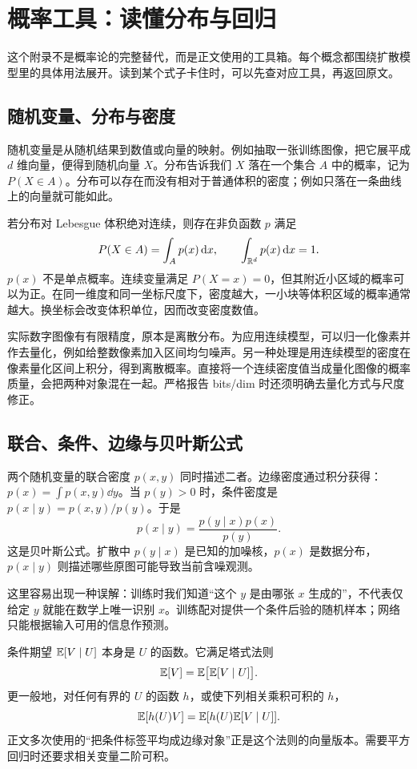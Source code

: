 \chapter{概率工具：读懂分布与回归}\label{app:probability}
这个附录不是概率论的完整替代，而是正文使用的工具箱。每个概念都围绕扩散模型里的具体用法展开。读到某个式子卡住时，可以先查对应工具，再返回原文。

\section{随机变量、分布与密度}
随机变量是从随机结果到数值或向量的映射。例如抽取一张训练图像，把它展平成 $d$ 维向量，便得到随机向量 $X$。分布告诉我们 $X$ 落在一个集合 $A$ 中的概率，记为 $P(X\in A)$。分布可以存在而没有相对于普通体积的密度；例如只落在一条曲线上的向量就可能如此。

若分布对 Lebesgue 体积绝对连续，则存在非负函数 $p$ 满足
\begin{equation}
 P(X\in A)=\int_Ap(x)\mathop{}\!\mathrm{d} x,\qquad\int_{\mathbb{R}^d}p(x)\mathop{}\!\mathrm{d} x=1.
\end{equation}
$p(x)$ 不是单点概率。连续变量满足 $P(X=x)=0$，但其附近小区域的概率可以为正。在同一维度和同一坐标尺度下，密度越大，一小块等体积区域的概率通常越大。换坐标会改变体积单位，因而改变密度数值。

实际数字图像有有限精度，原本是离散分布。为应用连续模型，可以归一化像素并作去量化，例如给整数像素加入区间均匀噪声。另一种处理是用连续模型的密度在像素量化区间上积分，得到离散概率。直接将一个连续密度值当成量化图像的概率质量，会把两种对象混在一起。严格报告 bits/dim 时还须明确去量化方式与尺度修正。

\section{联合、条件、边缘与贝叶斯公式}
两个随机变量的联合密度 $p(x,y)$ 同时描述二者。边缘密度通过积分获得：$p(x)=\int p(x,y)\dd y$。当 $p(y)>0$ 时，条件密度是 $p(x\mid y)=p(x,y)/p(y)$。于是
\begin{equation}
 p(x\mid y)=\frac{p(y\mid x)p(x)}{p(y)}.
\end{equation}
这是贝叶斯公式。扩散中 $p(y\mid x)$ 是已知的加噪核，$p(x)$ 是数据分布，$p(x\mid y)$ 则描述哪些原图可能导致当前含噪观测。

这里容易出现一种误解：训练时我们知道“这个 $y$ 是由哪张 $x$ 生成的”，不代表仅给定 $y$ 就能在数学上唯一识别 $x$。训练配对提供一个条件后验的随机样本；网络只能根据输入可用的信息作预测。

条件期望 $\mathbb{E}[V\mid U]$ 本身是 $U$ 的函数。它满足塔式法则
\begin{equation}
 \mathbb{E}[V]=\mathbb{E}\bigl[\mathbb{E}[V\mid U]\bigr].
\end{equation}
更一般地，对任何有界的 $U$ 的函数 $h$，或使下列相关乘积可积的 $h$，
\begin{equation}
 \mathbb{E}[h(U)V]=\mathbb{E}[h(U)\mathbb{E}[V\mid U]].
\end{equation}
正文多次使用的“把条件标签平均成边缘对象”正是这个法则的向量版本。需要平方回归时还要求相关变量二阶可积。

